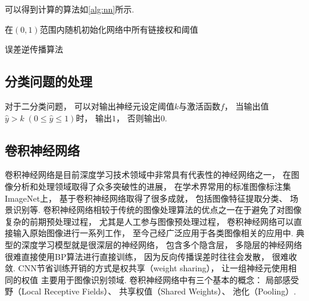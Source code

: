 可以得到计算的算法如\cref{alg:nn}所示\cite{zhouJiQiXueXi}.

\begin{algorithm}
    在$(0, 1)$范围内随机初始化网络中所有链接权和阈值\;
    \caption{误差逆传播算法}
    \label{alg:nn}
\end{algorithm}

\subsection{分类问题的处理}

对于二分类问题，
可以对输出神经元设定阈值$k$与激活函数$f$，
当输出值$\hat{y}>k\;(0\leqslant\hat{y}\leqslant1)$时，
输出$1$，
否则输出$0$.

\subsection{卷积神经网络}

卷积神经网络是目前深度学习技术领域中非常具有代表性的神经网络之一，
在图像分析和处理领域取得了众多突破性的进展，
在学术界常用的标准图像标注集ImageNet上，
基于卷积神经网络取得了很多成就，
包括图像特征提取分类、
场景识别等.
卷积神经网络相较于传统的图像处理算法的优点之一在于避免了对图像复杂的前期预处理过程，
尤其是人工参与图像预处理过程，
卷积神经网络可以直接输入原始图像进行一系列工作，
至今己经广泛应用于各类图像相关的应用中.
典型的深度学习模型就是很深层的神经网络，
包含多个隐含层，
多隐层的神经网络很难直接使用BP算法进行直接训练，
因为反向传播误差时往往会发散，
很难收敛.
CNN节省训练开销的方式是权共享（weight sharing），
让一组神经元使用相同的权值
主要用于图像识别领域.
卷积神经网络中有三个基本的概念：
局部感受野（Local Receptive Fields）、
共享权值（Shared Weights）、
池化（Pooling）.
